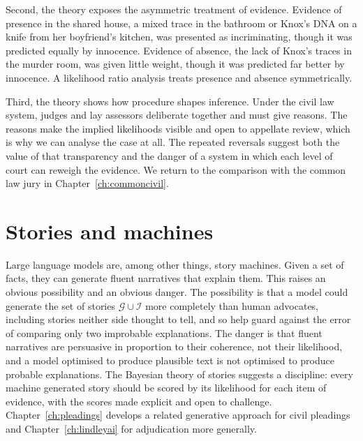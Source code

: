 Second, the theory exposes the asymmetric treatment of evidence. Evidence of presence in the shared house, a mixed trace in the bathroom or Knox's DNA on a knife from her boyfriend's kitchen, was presented as incriminating, though it was predicted equally by innocence. Evidence of absence, the lack of Knox's traces in the murder room, was given little weight, though it was predicted far better by innocence. A likelihood ratio analysis treats presence and absence symmetrically.

Third, the theory shows how procedure shapes inference. Under the civil law system, judges and lay assessors deliberate together and must give reasons. The reasons make the implied likelihoods visible and open to appellate review, which is why we can analyse the case at all. The repeated reversals suggest both the value of that transparency and the danger of a system in which each level of court can reweigh the evidence. We return to the comparison with the common law jury in Chapter~\ref{ch:commoncivil}.

\section{Stories and machines}

Large language models are, among other things, story machines. Given a set of facts, they can generate fluent narratives that explain them. This raises an obvious possibility and an obvious danger. The possibility is that a model could generate the set of stories $\mathcal{G}\cup\mathcal{I}$ more completely than human advocates, including stories neither side thought to tell, and so help guard against the error of comparing only two improbable explanations. The danger is that fluent narratives are persuasive in proportion to their coherence, not their likelihood, and a model optimised to produce plausible text is not optimised to produce probable explanations. The Bayesian theory of stories suggests a discipline: every machine generated story should be scored by its likelihood for each item of evidence, with the scores made explicit and open to challenge. Chapter~\ref{ch:pleadings} develops a related generative approach for civil pleadings and Chapter~\ref{ch:lindleyai} for adjudication more generally.

